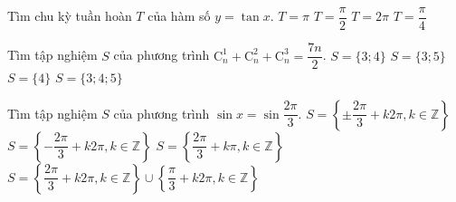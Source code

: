 \begin{ex}%
	Tìm chu kỳ tuần hoàn $T$ của hàm số $y=\tan x$.
	\choice
	{\True $T=\pi$}
	{$T=\dfrac{\pi}{2}$}
	{$T=2\pi$}
	{$T=\dfrac{\pi}{4}$}
\end{ex}

\begin{ex}%
	Tìm tập nghiệm $S$ của phương trình $\mathrm{C}_n^1 + \mathrm{C}_n^2 + \mathrm{C}_n^3 =\dfrac{7n}{2}$.
	\choice
	{$S=\{3;4\}$}
	{$S=\{3;5\}$}
	{\True $S=\{4\}$}
	{$S=\{3;4;5\}$}
\end{ex}

\begin{ex}%
	Tìm tập nghiệm $S$ của phương trình $\sin x=\sin\dfrac{2\pi}{3}$.
	\choice
	{$S=\left\{\pm\dfrac{2\pi}{3}+k2\pi, k\in \mathbb{Z}\right\}$}
	{$S=\left\{-\dfrac{2\pi}{3}+k2\pi, k\in \mathbb{Z}\right\}$}
	{$S=\left\{\dfrac{2\pi}{3}+k\pi, k\in \mathbb{Z}\right\}$}
	{\True $S=\left\{\dfrac{2\pi}{3}+k2\pi, k\in \mathbb{Z}\right\} \cup \left\{\dfrac{\pi}{3}+k2\pi, k\in \mathbb{Z}\right\}$}
\end{ex}

